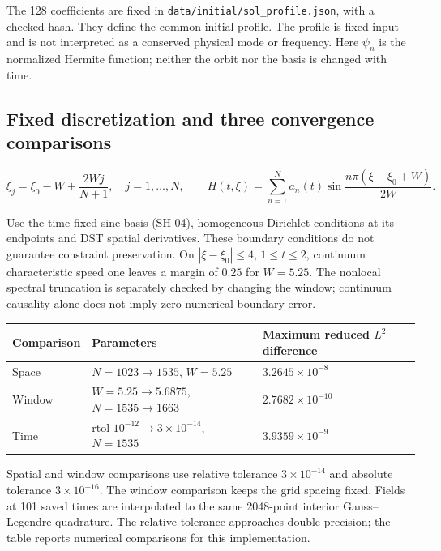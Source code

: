 The 128 coefficients are fixed in \texttt{data/initial/sol\_profile.json}, with a checked hash. They define the common initial profile. The profile is fixed input and is not interpreted as a conserved physical mode or frequency. Here $\psi_n$ is the normalized Hermite function; neither the orbit nor the basis is changed with time.

\subsection{Fixed discretization and three convergence comparisons}

\begin{equation}\tag{SH-04}\label{eq:SH-04}
\xi_j=\xi_0-W+\frac{2Wj}{N+1},\quad j=1,\ldots,N,\qquad
H(t,\xi)=\sum_{n=1}^N a_n(t)\sin\frac{n\pi(\xi-\xi_0+W)}{2W}.
\end{equation}

Use the time-fixed sine basis (SH-04), homogeneous Dirichlet conditions at its endpoints and DST spatial derivatives. These boundary conditions do not guarantee constraint preservation. On $|\xi-\xi_0|\le4$, $1\le t\le2$, continuum characteristic speed one leaves a margin of $0.25$ for $W=5.25$. The nonlocal spectral truncation is separately checked by changing the window; continuum causality alone does not imply zero numerical boundary error.

\begin{center}\small\begin{tabularx}{\textwidth}{@{}>{\raggedright\arraybackslash}X>{\raggedright\arraybackslash}X>{\raggedright\arraybackslash}X@{}}\toprule
Comparison & Parameters & Maximum reduced $L^2$ difference\\\midrule
Space &  $N=1023\to1535$, $W=5.25$ & $3.2645\times10^{-8}$\\
Window & $W=5.25\to5.6875$, $N=1535\to1663$ & $2.7682\times10^{-10}$\\
Time & rtol $10^{-12}\to3\times10^{-14}$, $N=1535$ & $3.9359\times10^{-9}$\\
\bottomrule\end{tabularx}\end{center}

Spatial and window comparisons use relative tolerance $3\times10^{-14}$ and absolute tolerance $3\times10^{-16}$. The window comparison keeps the grid spacing fixed. Fields at 101 saved times are interpolated to the same 2048-point interior Gauss--Legendre quadrature. The relative tolerance approaches double precision; the table reports numerical comparisons for this implementation.

